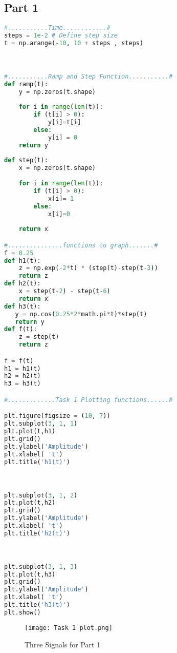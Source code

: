 \documentclass[11pt,a4]{report}
\begin{document}
\subsection{Part 1}
\begin{lstlisting}[language=Python]
#...........Time............#
steps = 1e-2 # Define step size
t = np.arange(-10, 10 + steps , steps)



#...........Ramp and Step Function...........#
def ramp(t):
    y = np.zeros(t.shape)
    
    for i in range(len(t)):
        if (t[i] > 0):
            y[i]=t[i]
        else: 
            y[i] = 0
    return y
        
def step(t):
    x = np.zeros(t.shape)
    
    for i in range(len(t)):
        if (t[i] > 0):
            x[i]= 1
        else:
            x[i]=0
            
    return x

#...............functions to graph.......#
f = 0.25
def h1(t):
    z = np.exp(-2*t) * (step(t)-step(t-3))
    return z
def h2(t):
    x = step(t-2) - step(t-6)
    return x
def h3(t):
   y = np.cos(0.25*2*math.pi*t)*step(t)
   return y
def f(t):
    z = step(t)
    return z

f = f(t)            
h1 = h1(t)
h2 = h2(t)
h3 = h3(t)

#.............Task 1 Plotting functions......#

plt.figure(figsize = (10, 7))
plt.subplot(3, 1, 1)
plt.plot(t,h1)
plt.grid()
plt.ylabel('Amplitude')
plt.xlabel( 't')
plt.title('h1(t)')



plt.subplot(3, 1, 2)
plt.plot(t,h2)
plt.grid()
plt.ylabel('Amplitude')
plt.xlabel( 't')
plt.title('h2(t)')



plt.subplot(3, 1, 3)
plt.plot(t,h3)
plt.grid()
plt.ylabel('Amplitude')
plt.xlabel( 't')
plt.title('h3(t)')
plt.show()


\end{lstlisting}

\begin{figure}[h!]
    \begin{center}
  \caption{Three Signals for Part 1}
  \texttt{[image: Task 1 plot.png]}
\end{center}
\end{figure}
\newpage
\end{document}
